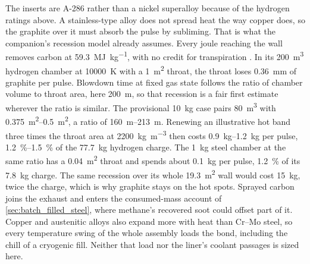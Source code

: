 \documentclass{article}
\begin{document}
The inserts are A-286 rather than a nickel superalloy because of the hydrogen ratings above. A stainless-type alloy does not spread heat the way copper does, so the graphite over it must absorb the pulse by subliming. That is what the companion's recession model already assumes. Every joule reaching the wall removes carbon at \SI{59.3}{\mega\joule\per\kilogram}, with no credit for transpiration \cite{Katz_puffsat_impact_sim_2026}. In its \SI{200}{\cubic\meter} hydrogen chamber at \SI{10000}{\kelvin} with a \SI{1}{\square\meter} throat, the throat loses \SI{0.36}{\milli\meter} of graphite per pulse. Blowdown time at fixed gas state follows the ratio of chamber volume to throat area, here \SI{200}{\meter}, so that recession is a fair first estimate wherever the ratio is similar. The provisional \SI{10}{\kilogram} case pairs \SI{80}{\cubic\meter} with \SIrange{0.375}{0.5}{\square\meter}, a ratio of \SIrange{160}{213}{\meter}. Renewing an illustrative hot band three times the throat area at \SI{2200}{\kilogram\per\cubic\meter} then costs \SIrange{0.9}{1.2}{\kilogram} per pulse, \SIrange{1.2}{1.5}{\percent} of the \SI{77.7}{\kilogram} hydrogen charge. The \SI{1}{\kilogram} steel chamber at the same ratio has a \SI{0.04}{\square\meter} throat and spends about \SI{0.1}{\kilogram} per pulse, \SI{1.2}{\percent} of its \SI{7.8}{\kilogram} charge. The same recession over its whole \SI{19.3}{\square\meter} wall would cost \SI{15}{\kilogram}, twice the charge, which is why graphite stays on the hot spots. Sprayed carbon joins the exhaust and enters the consumed-mass account of \autoref{sec:batch_filled_steel}, where methane's recovered soot could offset part of it. Copper and austenitic alloys also expand more with heat than Cr--Mo steel, so every temperature swing of the whole assembly loads the bond, including the chill of a cryogenic fill. Neither that load nor the liner's coolant passages is sized here.
\end{document}
